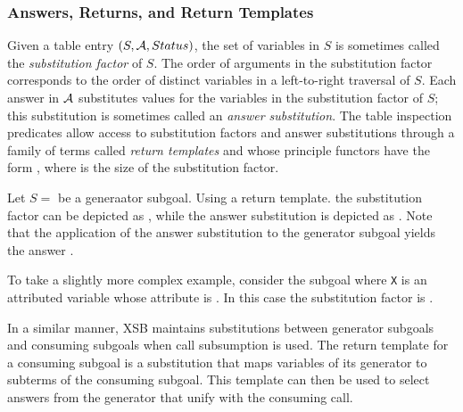 


\subsubsection*{Answers, Returns, and Return Templates}

%
Given a table entry $(S,{\cal A},Status)$, the set of variables in $S$ is
sometimes called the {\em substitution factor} of $S$.  The order of
arguments in the substitution factor corresponds to the order of
distinct variables in a left-to-right traversal of $S$.  Each answer
in ${\cal A}$ substitutes values for the variables in the substitution
factor of $S$; this substitution is sometimes called an {\em answer
  substitution}.  The table inspection predicates allow access to
substitution factors and answer substitutions through a family of
terms called {\em return templates} and whose principle functors have
the form \retn, where  is the size of the substitution factor.

\begin{example}
Let $S =$  be a generaator subgoal.  Using a return
template. the substitution factor can be depicted as ,
while the answer substitution  is depicted as
.  Note that the application of the answer substitution
to the generator subgoal yields the answer .

To take a slightly more complex example, consider the subgoal
 where {\tt X} is an attributed variable whose attribute is
.  In this case the substitution factor is
.\fillBox
\end{example}

In a similar manner, XSB maintains substitutions between generator
subgoals and consuming subgoals when call subsumption is used.  The
return template for a consuming subgoal is a substitution that maps
variables of its generator to subterms of the consuming subgoal.  This
template can then be used to select answers from the generator that
unify with the consuming call.  

